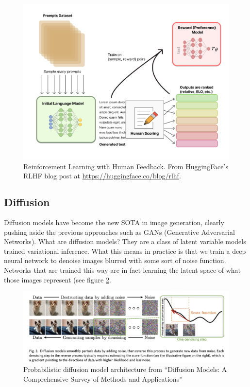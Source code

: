 \documentclass{article}
\begin{document}
\begin{figure}
    \centering
    \includegraphics[width=\textwidth,height=\textheight,keepaspectratio]{rlhf.png}
    \caption{Reinforcement Learning with Human Feedback. From HuggingFace’s RLHF blog post at \url{https://huggingface.co/blog/rlhf}. }
    \label{fig:rlhf}
\end{figure}



\subsection{Diffusion}

Diffusion models have become the new SOTA in image generation, clearly pushing aside the previous approaches such as GANs (Generative Adversarial Networks). What are diffusion models? They are a class of latent variable models trained variational inference. What this means in practice is that we train a deep neural network to denoise images blurred with some sort of noise function. Networks that are trained this way are in fact learning the latent space of what those images represent (see figure \ref{fig:diffusion}.

\begin{figure}
    \centering
    \includegraphics[width=\textwidth,height=\textheight,keepaspectratio]{diffusion.png}
    \caption{Probabilistic diffusion model architecture from “Diffusion Models: A Comprehensive Survey of Methods and Applications” \cite{yang2022diffusion} }
    \label{fig:diffusion}
\end{figure}
\end{document}
